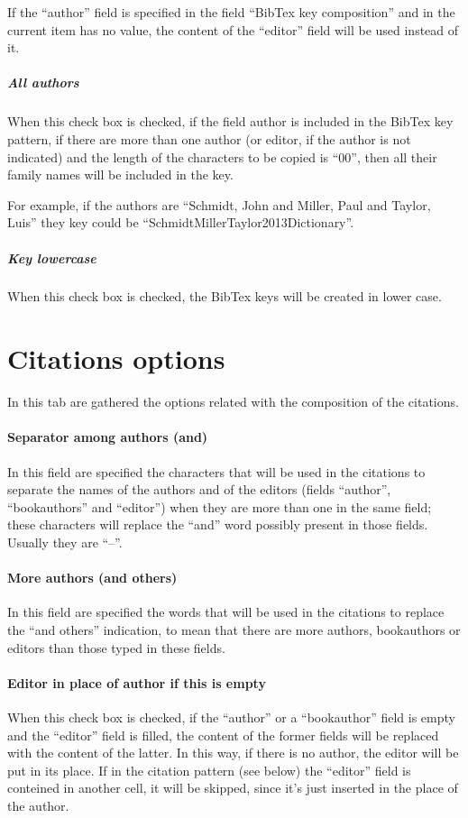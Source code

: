 \documentclass[a4paper,12pt]{report}
\begin{document}
If the “author” field is specified in the field “BibTex key composition” and in the current item has no value, the content of the “editor” field will be used instead of it.

\subparagraph{All authors} When this check box is checked, if the field author is included in the BibTex key pattern, if there are more than one author (or editor, if the author is not indicated) and the length of the characters to be copied is “00”, then all their family names will be included in the key.

\noindent For example, if the authors are “Schmidt, John and Miller, Paul and Taylor, Luis” they key could be “SchmidtMillerTaylor2013Dictionary”.

\subparagraph{Key lowercase} When this check box is checked, the BibTex keys will be created in lower case.

\section{Citations options}

In this tab are gathered the options related with the composition of the citations.

\paragraph{Separator among authors (and)} In this field are specified the characters that will be used in the citations to separate the names of the authors and of the editors (fields “author”, “bookauthors” and “editor”) when they are more than one in the same field; these characters will replace the “and” word possibly present in those fields. Usually they are “--”.

\paragraph{More authors (and others)} In this field are specified the words that will be used in the citations to replace the “and others” indication, to mean that there are more authors, bookauthors or editors than those typed in these fields.

\paragraph{Editor in place of author if this is empty} When this check box is checked, if the “author” or a “bookauthor” field is empty and the “editor” field is filled, the content of the former fields will be replaced with the content of the latter. In this way, if there is no author, the editor will be put in its place. If in the citation pattern (see below) the “editor” field is conteined in another cell, it will be skipped, since it's just inserted in the place of the author. 
\end{document}
